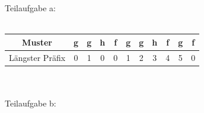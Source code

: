 \documentclass[12pt]{scrartcl}
\begin{document}

\exercise{}

Teilaufgabe a:\\\\
\begin{tabular}{|c|c|c|c|c|c|c|c|c|c|c|}
\hline 
Muster & g & g & h & f & g & g & h & f & g & f\\ 
\hline 
Längster Präfix & 0 & 1 & 0 & 0 & 1 & 2 & 3 & 4 & 5 & 0\\ 
\hline 
\end{tabular}
\\\\
Teilaufgabe b:
\end{document}
